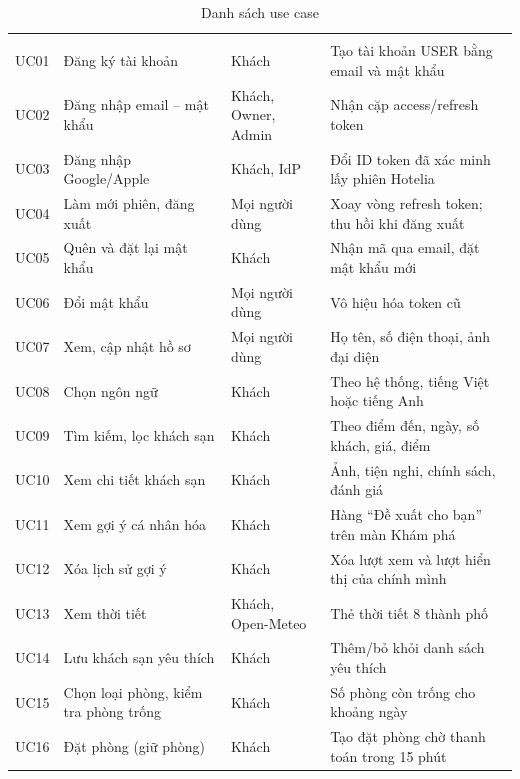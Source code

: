 \begin{rtable}
\begin{longtable}{|C{1.2cm}|L{5.4cm}|L{2.5cm}|L{5.6cm}|}
\caption{Danh sách use case}\label{tab:uc-list}\\
\hline
{} &  &  &  \\ \hline
\endfirsthead
\hline
{} &  &  &  \\ \hline
\endhead
UC01 & Đăng ký tài khoản & Khách & Tạo tài khoản USER bằng email và mật khẩu \\ \hline
UC02 & Đăng nhập email -- mật khẩu & Khách, Owner, Admin & Nhận cặp access/refresh token \\ \hline
UC03 & Đăng nhập Google/Apple & Khách, IdP & Đổi ID token đã xác minh lấy phiên Hotelia \\ \hline
UC04 & Làm mới phiên, đăng xuất & Mọi người dùng & Xoay vòng refresh token; thu hồi khi đăng xuất \\ \hline
UC05 & Quên và đặt lại mật khẩu & Khách & Nhận mã qua email, đặt mật khẩu mới \\ \hline
UC06 & Đổi mật khẩu & Mọi người dùng & Vô hiệu hóa token cũ \\ \hline
UC07 & Xem, cập nhật hồ sơ & Mọi người dùng & Họ tên, số điện thoại, ảnh đại diện \\ \hline
UC08 & Chọn ngôn ngữ & Khách & Theo hệ thống, tiếng Việt hoặc tiếng Anh \\ \hline
UC09 & Tìm kiếm, lọc khách sạn & Khách & Theo điểm đến, ngày, số khách, giá, điểm \\ \hline
UC10 & Xem chi tiết khách sạn & Khách & Ảnh, tiện nghi, chính sách, đánh giá \\ \hline
UC11 & Xem gợi ý cá nhân hóa & Khách & Hàng ``Đề xuất cho bạn'' trên màn Khám phá \\ \hline
UC12 & Xóa lịch sử gợi ý & Khách & Xóa lượt xem và lượt hiển thị của chính mình \\ \hline
UC13 & Xem thời tiết & Khách, Open-Meteo & Thẻ thời tiết 8 thành phố \\ \hline
UC14 & Lưu khách sạn yêu thích & Khách & Thêm/bỏ khỏi danh sách yêu thích \\ \hline
UC15 & Chọn loại phòng, kiểm tra phòng trống & Khách & Số phòng còn trống cho khoảng ngày \\ \hline
UC16 & Đặt phòng (giữ phòng) & Khách & Tạo đặt phòng chờ thanh toán trong 15 phút \\ \hline

\end{longtable}
\end{rtable}
